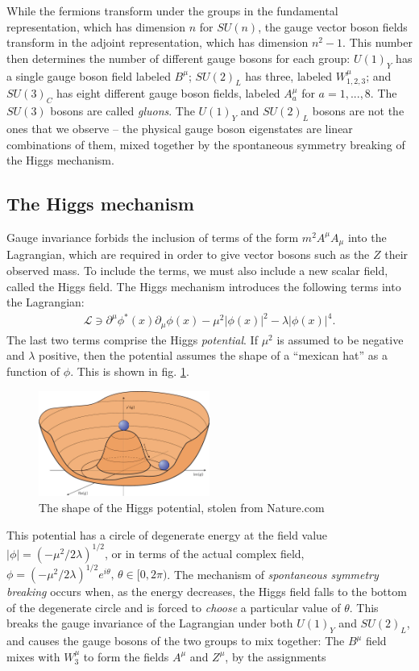 \documentclass[twoside,english]{uiofysmaster}
\begin{document}
While the fermions transform under the groups in the fundamental representation, which has dimension $n$ for $SU(n)$, the gauge vector boson fields transform in the adjoint representation, which has dimension $n^2-1$. This number then determines the number of different gauge bosons for each group: $U(1)_Y$ has a single gauge boson field labeled $B^\mu$; $SU(2)_L$ has three, labeled $W^\mu_{1,2,3}$; and $SU(3)_C$ has eight different gauge boson fields, labeled $A^\mu_a$ for $a = 1,...,8$. The $SU(3)$ bosons are called {\it gluons}. The $U(1)_Y$ and $SU(2)_L$ bosons are not the ones that we observe -- the physical gauge boson eigenstates are linear combinations of them, mixed together by the spontaneous symmetry breaking of the Higgs mechanism.

\subsection{The Higgs mechanism}
Gauge invariance forbids the inclusion of terms of the form $m^2A^\mu A_\mu$ into the Lagrangian, which are required in order to give vector bosons such as the $Z$ their observed mass. To include the terms, we must also include a new scalar field, called the Higgs field. The Higgs mechanism introduces the following terms into the Lagrangian:
\begin{align}
	\mathcal L \ni \partial^\mu \phi^*(x) \partial_\mu \phi(x) - \mu^2|\phi(x)|^2 - \lambda |\phi(x)|^4.
\end{align}
The last two terms comprise the Higgs {\it potential}. If $\mu^2$ is assumed to be negative and $\lambda$ positive, then the potential assumes the shape of a ``mexican hat'' as a function of $\phi$. This is shown in fig. \ref{fig:higgspot}.
\begin{figure}[hbt]
	\centering
	\includegraphics[width=0.5\textwidth]{figures/susyintro/higgspot_nature.jpg}
	\caption{The shape of the Higgs potential, stolen from Nature.com}
	\label{fig:higgspot}
\end{figure}
This potential has a circle of degenerate energy at the field value $|\phi| = (-\mu^2/2\lambda)^{1/2}$, or in terms of the actual complex field, $\phi = (-\mu^2/2\lambda)^{1/2}e^{i\theta}, \, \theta \in [0,2\pi)$. The mechanism of {\it spontaneous symmetry breaking} occurs when, as the energy decreases, the Higgs field falls to the bottom of the degenerate circle and is forced to {\it choose} a particular value of $\theta$. This breaks the gauge invariance of the Lagrangian under both $U(1)_Y$ and $SU(2)_L$, and causes the gauge bosons of the two groups to mix together: The $B^\mu$ field mixes with $W^\mu_3$ to form the fields $A^\mu$ and $Z^\mu$, by the assignments
\end{document}
